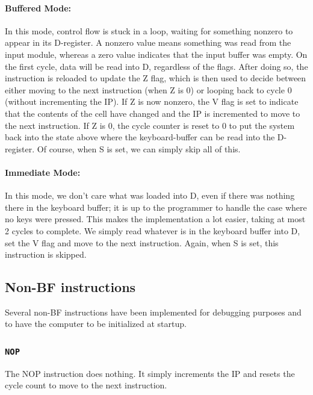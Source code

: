 \paragraph{Buffered Mode:}
In this mode, control flow is stuck in a loop, waiting for something nonzero to appear in its D-register. A nonzero value means something was read from the input module, whereas a zero value indicates that the input buffer was empty. On the first cycle, data will be read into D, regardless of the flags. After doing so, the instruction is reloaded to update the Z flag, which is then used to decide between either moving to the next instruction (when Z is 0) or looping back to cycle 0 (without incrementing the IP). If Z is now nonzero, the V flag is set to indicate that the contents of the cell have changed and the IP is incremented to move to the next instruction. If Z is 0, the cycle counter is reset to 0 to put the system back into the state above where the keyboard-buffer can be read into the D-register. Of course, when S is set, we can simply skip all of this.

\paragraph{Immediate Mode:}
In this mode, we don't care what was loaded into D, even if there was nothing there in the keyboard buffer; it is up to the programmer to handle the case where no keys were pressed. This makes the implementation a lot easier, taking at most 2 cycles to complete. We simply read whatever is in the keyboard buffer into D, set the V flag and move to the next instruction. Again, when S is set, this instruction is skipped.
  
\subsection{Non-BF instructions} \label{seq:sequences:nonbf}
Several non-BF instructions have been implemented for debugging purposes and to have the computer to be initialized at startup.

\subsubsection{\texttt{NOP}}
The NOP instruction does nothing. It simply increments the IP and resets the cycle count to move to the next instruction.


